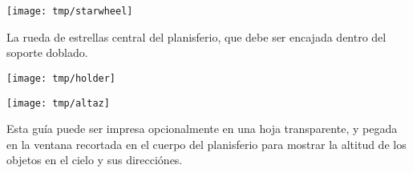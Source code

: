 \documentclass[a4paper,onecolumn,10pt]{article}
\begin{document}
\centerline{\texttt{[image: tmp/starwheel]}}

\vspace{1cm}
La rueda de estrellas central del planisferio, que debe ser encajada dentro del soporte doblado.

\newpage
\thispagestyle{empty}
\vspace*{-3.0cm}
\centerline{\texttt{[image: tmp/holder]}}
\newpage

\centerline{\texttt{[image: tmp/altaz]}}

\vspace{1cm}
Esta guía puede ser impresa opcionalmente en una hoja transparente, y pegada en la
ventana recortada en el cuerpo del planisferio para mostrar la altitud de los objetos
en el cielo y sus direcciónes.
\end{document}
